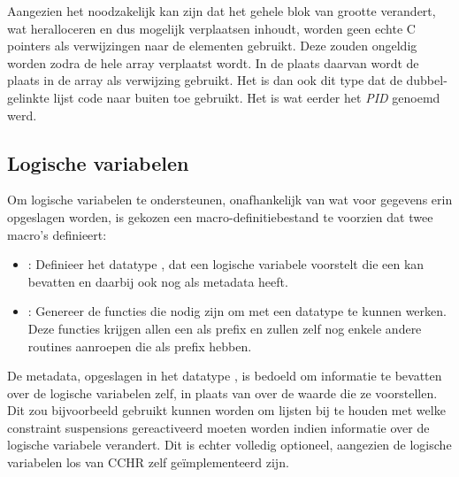 {Aangezien het noodzakelijk kan zijn dat het gehele blok van grootte verandert, wat heralloceren en dus mogelijk verplaatsen inhoudt, worden geen echte C pointers als verwijzingen naar de elementen gebruikt. Deze zouden ongeldig worden zodra de hele array verplaatst wordt. In de plaats daarvan wordt de plaats in de array als verwijzing gebruikt. Het is dan ook dit type dat de dubbel-gelinkte lijst code naar buiten toe gebruikt. Het is wat eerder het {\em PID} genoemd werd. 

\subsection{Logische variabelen} \label{sec:logvar}

Om logische variabelen te ondersteunen, onafhankelijk van wat voor gegevens erin opgeslagen worden, is gekozen een macro-definitiebestand te voorzien dat twee macro's definieert: \begin{itemize}
  \item {}: Definieer het datatype , dat een logische variabele voorstelt die een  kan bevatten en daarbij ook nog  als metadata heeft.
  \item {}: Genereer de functies die nodig zijn om met een  datatype te kunnen werken. Deze functies krijgen allen een  als prefix en zullen zelf nog enkele andere routines aanroepen die  als prefix hebben.
\end{itemize}

De metadata, opgeslagen in het datatype , is bedoeld om informatie te bevatten over de logische variabelen zelf, in plaats van over de waarde die ze voorstellen. Dit zou bijvoorbeeld gebruikt kunnen worden om lijsten bij te houden met welke constraint suspensions gereactiveerd moeten worden indien informatie over de logische variabele verandert. Dit is echter volledig optioneel, aangezien de logische variabelen los van CCHR zelf ge\"implementeerd zijn.

}

